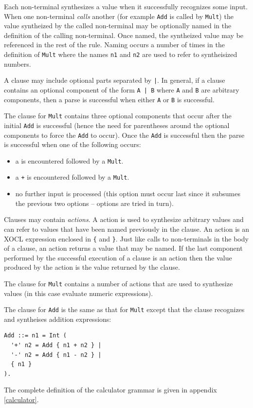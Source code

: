\documentclass{article}
\begin{document}
Each non-terminal synthesizes a value when it successfully recognizes
some input. When one non-terminal {\em calls} another (for example {\tt Add}
is called by {\tt Mult}) the value syntheized by the called non-terminal
may be optionally named in the definition of the calling non-terminal.
Once named, the syntheized value may be referenced in the rest of the 
rule. Naming occurs a number of times in the definition of {\tt Mult}
where the names {\tt n1} and {\tt n2} are used to refer to syntheisized
numbers.

A clause may include optional parts separated by {\tt |}. In general,
if a clause contains an optional component of the form {\tt A | B}
where {\tt A} and {\tt B} are arbitrary components, then a parse
is successful when either {\tt A} or {\tt B} is successful. 

The clause
for {\tt Mult} contains three optional components that occur after the
initial {\tt Add} is successful (hence the need for parentheses around
the optional components to force the {\tt Add} to occur). Once the
{\tt Add} is successful then the parse is successful when one of the 
following occurs:
\begin{itemize}
\item a {\tt *} is encountered followed by a {\tt Mult}.
\item a {\tt +} is encountered followed by a {\tt Mult}.
\item no further input is processed (this option must occur last since
it subsumes the previous two options -- options are tried in turn).
\end{itemize}
Clauses may contain {\em actions}. A action is used to synthesize arbitrary
values and can refer to values that have been named previously in the 
clause. An action is an XOCL expression enclosed in {\tt \{} and {\tt \}}.
Just like calls to non-terminals in the body of a clause, an action
returns a value that may be named. If the last component performed by
the successful execution of a clause is an action then the value produced
by the action is the value returned by the clause.

The clause for {\tt Mult} contains a number of actions that are used
to synthesize values (in this case evaluate numeric expressions).

The clause for {\tt Add} is the same as that for {\tt Mult} except
that the clause recognizes and syntheises addition expressions:
\begin{verbatim}
Add ::= n1 = Int ( 
  '+' n2 = Add { n1 + n2 } |
  '-' n2 = Add { n1 - n2 } |
  { n1 }    
).   
\end{verbatim}
The complete definition of the calculator grammar is given in appendix
\ref{calculator}.
\end{document}

